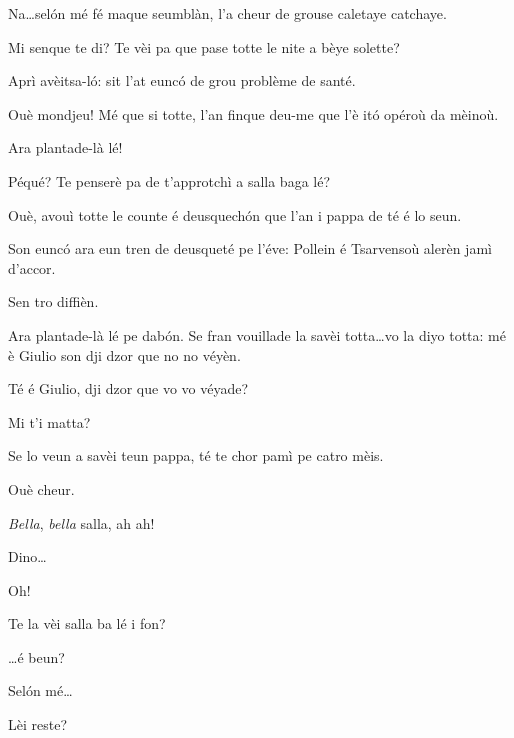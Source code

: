 \begin{drama}
\Vilmaspeaks Na\ldots sel\'on mé fé maque seumblàn, l’a cheur de grouse caletaye catchaye.

\Ornellaspeaks Mi senque te di? Te vèi pa que pase totte le nite a bèye solette?

\Vandaspeaks{} Aprì avèitsa-l\'o: sit l’at eunc\'o de grou problème de santé.


\Ornellaspeaks Ouè mondjeu! Mé que si totte, l’an finque deu-me que l’è it\'o opéroù da mèinoù.

\Vilmaspeaks{} Ara plantade-là lé!

\Vandaspeaks	Péqué? Te penserè pa de t’approtchì a salla baga lé?

\Ornellaspeaks	 Ouè, avouì totte le counte é deusquech\'on que l’an i pappa de té é lo seun.

\Vandaspeaks	Son eunc\'o ara eun tren de deusqueté pe l’éve: Pollein é Tsarvensoù alerèn jamì d’accor.

\Ornellaspeaks	 Sen tro diffièn.

\Vilmaspeaks Ara plantade-là lé pe dab\'on.  Se fran vouillade la savèi totta\ldots vo la diyo totta: mé è Giulio son dji dzor que no no véyèn.

\Ornellaspeaks	 Té é Giulio, dji dzor que vo vo véyade?

\Vandaspeaks Mi t'i matta?

\Ornellaspeaks Se lo veun a savèi teun pappa, té te chor pamì pe catro mèis.

\Ornellaspeaks Ouè cheur.


\Dinospeaks{} \textit{Bella}, \textit{bella} salla, ah ah!

\Genespeaks Dino\ldots

\Dinospeaks Oh!

\Genespeaks{} Te la vèi salla ba lé i fon?

\Dinospeaks \ldots é beun?

\Genespeaks Sel\'on mé\ldots

\Dinospeaks Lèi reste?


\end{drama}
